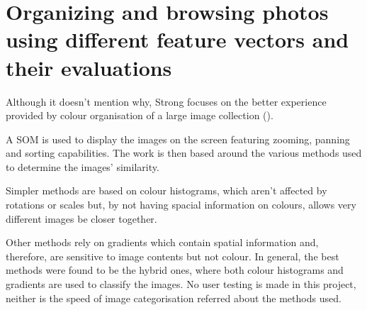 \section{Organizing and browsing photos using different feature vectors and their evaluations} %
\label{sub:Strong}

Although it doesn't mention why, Strong \cite{Strong:2009p413} focuses on the better experience provided by colour organisation of a large image collection ().

A \ac{SOM} is used to display the images on the screen featuring zooming, panning and sorting capabilities. The work is then based around the various methods used to determine the images' similarity.

Simpler methods are based on colour histograms, which aren't affected by rotations or scales but, by not having spacial information on colours, allows very different images be closer together.

Other methods rely on gradients which contain spatial information and, therefore, are sensitive to image contents but not colour.
In general, the best methods were found to be the hybrid ones, where both colour histograms and gradients are used to classify the images.
No user testing is made in this project, neither is the speed of image categorisation referred about the methods used.

